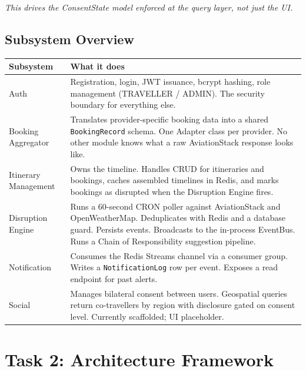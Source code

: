 \documentclass[12pt,a4paper]{article}
\begin{document}
\textit{This drives the ConsentState model enforced at the query layer, not just the UI.}

\subsection{Subsystem Overview}

\begin{tabularx}{\textwidth}{@{}lX@{}}
\toprule
\textbf{Subsystem} & \textbf{What it does} \\
\midrule
Auth & Registration, login, JWT issuance, bcrypt hashing, role management (TRAVELLER /
  ADMIN). The security boundary for everything else. \\[0.3em]
Booking Aggregator & Translates provider-specific booking data into a shared
  \texttt{BookingRecord} schema. One Adapter class per provider. No other module knows what
  a raw AviationStack response looks like. \\[0.3em]
Itinerary Management & Owns the timeline. Handles CRUD for itineraries and bookings, caches
  assembled timelines in Redis, and marks bookings as disrupted when the Disruption Engine
  fires. \\[0.3em]
Disruption Engine & Runs a 60-second CRON poller against AviationStack and OpenWeatherMap.
  Deduplicates with Redis and a database guard. Persists events. Broadcasts to the in-process
  EventBus. Runs a Chain of Responsibility suggestion pipeline. \\[0.3em]
Notification & Consumes the Redis Streams channel via a consumer group. Writes a
  \texttt{NotificationLog} row per event. Exposes a read endpoint for past alerts. \\[0.3em]
Social & Manages bilateral consent between users. Geospatial queries return co-travellers by
  region with disclosure gated on consent level. Currently scaffolded; UI placeholder. \\
\bottomrule
\end{tabularx}

\section{Task 2: Architecture Framework}

\end{document}
